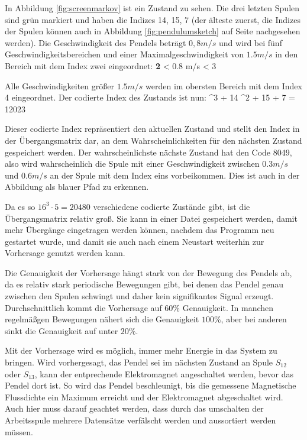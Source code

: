In Abbildung \ref{fig:screenmarkov} ist ein Zustand zu sehen.
Die drei letzten Spulen sind grün markiert und haben die Indizes 14, 15, 7 (der älteste zuerst, die Indizes der Spulen können auch in Abbildung \ref{fig:pendulumsketch} auf Seite \pageref{fig:pendulumsketch} nachgesehen werden).
Die Geschwindigkeit des Pendels beträgt $0,8 m/s$ und wird bei fünf Geschwindigkeitsbereichen und einer Maximalgeschwindigkeit von $1.5 m/s$ in den Bereich mit dem Index zwei eingeordnet:
\mathematik
\textbf{2}\cdot{} < 0.8 m/s < 3\cdot{}
\mathematikstop

Alle Geschwindigkeiten größer $1.5 m/s$ werden im obersten Bereich mit dem Index 4 eingeordnet.
Der codierte Index des Zustands ist nun:
 ^3 + 14 ^2 + 15  + 7 = 12023
\mathematikstop

Dieser codierte Index repräsentiert den aktuellen Zustand und stellt den Index in der Übergangsmatrix dar, an dem Wahrscheinlichkeiten für den nächsten Zustand gespeichert werden.
Der wahrscheinlichste nächste Zustand hat den Code 8049, also wird wahrscheinlich die Spule mit einer Geschwindigkeit zwischen $0.3 m/s$ und $0.6 m/s$ an der Spule mit dem Index eins vorbeikommen.
Dies ist auch in der Abbildung als blauer Pfad zu erkennen.

Da es so $16^3 \cdot 5 = 20480$ verschiedene codierte Zustände gibt, ist die Übergangsmatrix relativ groß.
Sie kann in einer Datei gespeichert werden, damit mehr Übergänge eingetragen werden können, nachdem das Programm neu gestartet wurde, und damit sie auch nach einem Neustart weiterhin zur Vorhersage
genutzt werden kann.

Die Genauigkeit der Vorhersage hängt stark von der Bewegung des Pendels ab, da es relativ stark periodische Bewegungen gibt, bei denen das Pendel genau zwischen den Spulen schwingt und daher kein signifikantes Signal erzeugt.
Durchschnittlich kommt die Vorhersage auf $60\%$ Genauigkeit.
In manchen regelmäßgen Bewegungen nähert sich die Genauigkeit $100\%$, aber bei anderen sinkt die Genauigkeit auf unter $20\%$.

Mit der Vorhersage wird es möglich, immer mehr Energie in das System zu bringen.
Wird vorhergesagt, das Pendel sei im nächsten Zustand an Spule $S_{12}$ oder $S_{13}$, kann der entprechende Elektromagnet angeschaltet werden, bevor das Pendel dort ist.
So wird das Pendel beschleunigt, bis die gemessene Magnetische Flussdichte ein Maximum erreicht und der Elektromagnet abgeschaltet wird.
Auch hier muss darauf geachtet werden, dass durch das umschalten der Arbeitsspule mehrere Datensätze verfälscht werden und aussortiert werden müssen.

